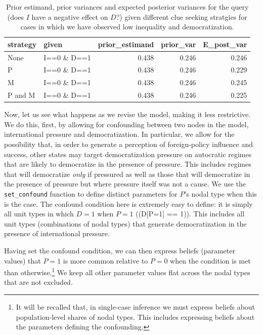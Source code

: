 \documentclass[12pt,]{book}
\let\rmarkdownfootnote\footnote%
\def\footnote{\protect\rmarkdownfootnote}
\begin{document}
\begin{table}[t]

\caption{\label{tab:unnamed-chunk-68}\label{pimdlearn_i0d1}Prior estimand, prior variances and expected posterior variances for the query (does $I$ have a negative effect on $D$?) given different  clue seeking  stratgies for cases in which we have observed low inequality and democratization.}
\centering
\begin{tabular}{l|l|r|r|r}
\hline
strategy & given & prior\_estimand & prior\_var & E\_post\_var\\
\hline
None & I==0 \& D==1 & 0.438 & 0.246 & 0.246\\
\hline
P & I==0 \& D==1 & 0.438 & 0.246 & 0.229\\
\hline
M & I==0 \& D==1 & 0.438 & 0.246 & 0.245\\
\hline
P and M & I==0 \& D==1 & 0.438 & 0.246 & 0.225\\
\hline
\end{tabular}
\end{table}

Now, let us see what happens as we revise the model, making it less restrictive. We do this, first, by allowing for confounding between two nodes in the model, international pressure and democratization. In particular, we allow for the possibility that, in order to generate a perception of foreign-policy influence and success, other states may target democratization pressure on autocratic regimes that are likely to democratize in the presence of pressure. This includes regimes that will democratize \emph{only} if pressured as well as those that will democratize in the presence of pressure but where pressure itself was not a cause. We use the \texttt{set\_confound} function to define distinct parameters for \(P\)'s nodal type when this is the case. The confound condition here is extremely easy to define: it is simply all unit types in which \(D=1\) when \(P=1\) ((D{[}P=1{]} == 1)). This includes all unit types (combinations of nodal types) that generate democratization in the presence of international pressure.

Having set the confound condition, we can then express beliefs (parameter values) that \(P=1\) is more common relative to \(P=0\) when the condition is met than otherwise.\footnote{It will be recalled that, in single-case inference we must express beliefs about population-level shares of nodal types. This includes expressing beliefs about the parameters defining the confounding.} We keep all other parameter values flat across the nodal types that are not excluded.
\end{document}
